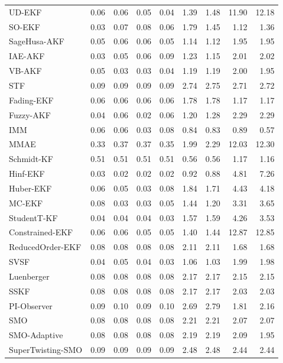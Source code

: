 \begin{longtable}{lrrrrrrrr}
UD-EKF & 0.06 & 0.06 & 0.05 & 0.04 & 1.39 & 1.48 & 11.90 & 12.18 \\
SO-EKF & 0.03 & 0.07 & 0.08 & 0.06 & 1.79 & 1.45 & 1.12 & 1.36 \\
SageHusa-AKF & 0.05 & 0.06 & 0.06 & 0.05 & 1.14 & 1.12 & 1.95 & 1.95 \\
IAE-AKF & 0.03 & 0.05 & 0.06 & 0.09 & 1.23 & 1.15 & 2.01 & 2.02 \\
VB-AKF & 0.05 & 0.03 & 0.03 & 0.04 & 1.19 & 1.19 & 2.00 & 1.95 \\
STF & 0.09 & 0.09 & 0.09 & 0.09 & 2.74 & 2.75 & 2.71 & 2.72 \\
Fading-EKF & 0.06 & 0.06 & 0.06 & 0.06 & 1.78 & 1.78 & 1.17 & 1.17 \\
Fuzzy-AKF & 0.04 & 0.06 & 0.02 & 0.06 & 1.20 & 1.28 & 2.29 & 2.29 \\
IMM & 0.06 & 0.06 & 0.03 & 0.08 & 0.84 & 0.83 & 0.89 & 0.57 \\
MMAE & 0.33 & 0.37 & 0.37 & 0.35 & 1.99 & 2.29 & 12.03 & 12.30 \\
Schmidt-KF & 0.51 & 0.51 & 0.51 & 0.51 & 0.56 & 0.56 & 1.17 & 1.16 \\
Hinf-EKF & 0.03 & 0.02 & 0.02 & 0.02 & 0.92 & 0.88 & 4.81 & 7.26 \\
Huber-EKF & 0.06 & 0.05 & 0.03 & 0.08 & 1.84 & 1.71 & 4.43 & 4.18 \\
MC-EKF & 0.08 & 0.03 & 0.03 & 0.05 & 1.44 & 1.20 & 3.31 & 3.65 \\
StudentT-KF & 0.04 & 0.04 & 0.04 & 0.03 & 1.57 & 1.59 & 4.26 & 3.53 \\
Constrained-EKF & 0.06 & 0.06 & 0.05 & 0.05 & 1.40 & 1.44 & 12.87 & 12.85 \\
ReducedOrder-EKF & 0.08 & 0.08 & 0.08 & 0.08 & 2.11 & 2.11 & 1.68 & 1.68 \\
SVSF & 0.04 & 0.05 & 0.04 & 0.03 & 1.06 & 1.03 & 1.99 & 1.98 \\
Luenberger & 0.08 & 0.08 & 0.08 & 0.08 & 2.17 & 2.17 & 2.15 & 2.15 \\
SSKF & 0.08 & 0.08 & 0.08 & 0.08 & 2.17 & 2.17 & 2.03 & 2.03 \\
PI-Observer & 0.09 & 0.10 & 0.09 & 0.10 & 2.69 & 2.79 & 1.81 & 2.16 \\
SMO & 0.08 & 0.08 & 0.08 & 0.08 & 2.21 & 2.21 & 2.07 & 2.07 \\
SMO-Adaptive & 0.08 & 0.08 & 0.08 & 0.08 & 2.19 & 2.19 & 2.09 & 1.95 \\
SuperTwisting-SMO & 0.09 & 0.09 & 0.09 & 0.09 & 2.48 & 2.48 & 2.44 & 2.44 \\

\end{longtable}
